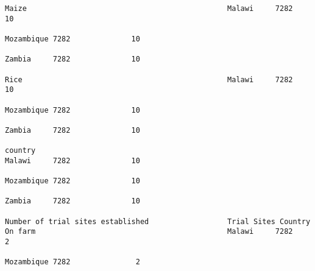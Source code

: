 \documentclass[11pt]{article}
\begin{document}
\begin{Verbatim}[commandchars=\\\{\}]
                                                                                                                                                              Maize                                              Malawi     7282              10  
                                                                                                                                                                                                                 Mozambique 7282              10  
                                                                                                                                                                                                                 Zambia     7282              10  
                                                                                                                                                              Rice                                               Malawi     7282              10  
                                                                                                                                                                                                                 Mozambique 7282              10  
                                                                                                                                                                                                                 Zambia     7282              10  
                                                                                                                            country                                                                              Malawi     7282              10  
                                                                                                                                                                                                                 Mozambique 7282              10  
                                                                                                                                                                                                                 Zambia     7282              10  
                                                                         Number of trial sites established                  Trial Sites Country               On farm                                            Malawi     7282               2  
                                                                                                                                                                                                                 Mozambique 7282               2  

\end{Verbatim}
\end{document}
